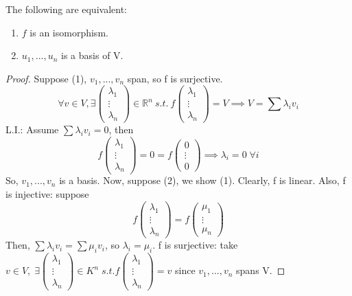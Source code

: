 \documentclass[12pt]{article}
\theoremstyle{definition}
\theoremstyle{remark}
\begin{document}
    \begin{proposition}
        The following are equivalent:
        \begin{enumerate}
            \item $f$ is an isomorphism. 
            \item $u_1,...,u_n$ is a basis of V.
        \end{enumerate}
        \begin{proof}
            Suppose (1), $v_1, ..., v_n$ span, so f is surjective. 
            $$\forall v \in V, \exists \begin{pmatrix}
                \lambda_1\\ \vdots \\ \lambda_n 
            \end{pmatrix} \in \mathbb{R}^n \: s.t. \: f\begin{pmatrix}
                \lambda_1\\ \vdots \\ \lambda_n 
            \end{pmatrix} = V \implies V=\sum \lambda_i v_i$$
            L.I.: Assume $\sum \lambda_i v_i = 0$, then 
            $$ f\begin{pmatrix}
                \lambda_1\\ \vdots \\ \lambda_n 
            \end{pmatrix}=0=f\begin{pmatrix}
                0\\ \vdots \\ 0 
            \end{pmatrix} \implies \lambda_i = 0 \; \forall i $$
            So, $v_1, ..., v_n$ is a basis. 
            \newline
            Now, suppose (2), we show (1). Clearly, f is linear. Also, f is injective: suppose
            $$f\begin{pmatrix}
                \lambda_1\\ \vdots \\ \lambda_n 
            \end{pmatrix} = f\begin{pmatrix}
                \mu_1\\ \vdots \\ \mu_n 
            \end{pmatrix}$$
            Then, $\sum \lambda_i v_i = \sum \mu_i v_i $, so $\lambda_i = \mu_i$. 
            \newline
            f is surjective: take $v\in V, \; \exists \begin{pmatrix}
                \lambda_1\\ \vdots \\ \lambda_n 
            \end{pmatrix} \in K^n \; s.t. f\begin{pmatrix}
                \lambda_1\\ \vdots \\ \lambda_n 
            \end{pmatrix} = v$ since $v_1, ..., v_n$ spans V. 
        \end{proof}
    \end{proposition}
\end{document}
